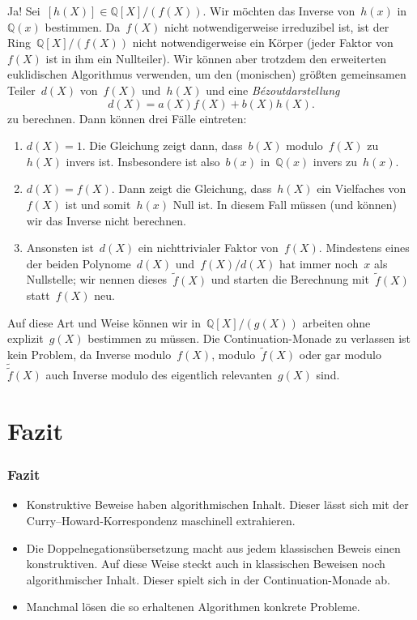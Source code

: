 \documentclass[12pt,utf8,notheorems,compress,t]{beamer}
\newcommand{\QQ}{\mathbb{Q}}
\renewcommand{\_}{\mathpunct{.}}
\newcommand{\?}{\,{:}\,}
\begin{document}
{\begin{multicols}{2}
    Ja! Sei~$[h(X)] \in \QQ[X]/(f(X))$. Wir möchten das Inverse von~$h(x)$
    in~$\QQ(x)$ bestimmen. Da~$f(X)$ nicht notwendigerweise irreduzibel ist, ist
    der Ring~$\QQ[X]/(f(X))$ nicht notwendigerweise ein Körper (jeder Faktor
    von~$f(X)$ ist in ihm ein Nullteiler). Wir können aber trotzdem den
    erweiterten euklidischen Algorithmus verwenden, um den (monischen) größten
    gemeinsamen Teiler~$d(X)$ von~$f(X)$ und~$h(X)$ und eine
    \emph{Bézoutdarstellung}
    \[ d(X) = a(X) f(X) + b(X) h(X). \]
    zu berechnen. Dann können drei Fälle eintreten:
    \begin{enumerate}\justifying
    \item $d(X) = 1$. Die Gleichung zeigt dann, dass~$b(X)$ modulo~$f(X)$
    zu~$h(X)$ invers ist. Insbesondere ist also~$b(x)$ in~$\QQ(x)$ invers
    zu~$h(x)$.
    \item $d(X) = f(X)$. Dann zeigt die Gleichung, dass~$h(X)$ ein Vielfaches
    von~$f(X)$ ist und somit~$h(x)$ Null ist. In diesem Fall müssen (und können)
    wir das Inverse nicht berechnen.
    \item Ansonsten ist~$d(X)$ ein nichttrivialer Faktor von~$f(X)$. Mindestens
    eines der beiden Polynome~$d(X)$ und~$f(X)/d(X)$ hat immer noch~$x$ als
    Nullstelle; wir nennen dieses~$\tilde f(X)$ und starten die Berechnung
    mit~$\tilde f(X)$ statt~$f(X)$ neu.
    \end{enumerate}

    Auf diese Art und Weise können wir in~$\QQ[X]/(g(X))$ arbeiten ohne
    explizit~$g(X)$ bestimmen zu müssen. Die Continuation-Monade zu verlassen ist
    kein Problem, da Inverse modulo~$f(X)$, modulo~$\tilde f(X)$ oder
    gar modulo~$\tilde{\tilde f}(X)$ auch Inverse modulo des eigentlich
    relevanten~$g(X)$ sind.
  \end{multicols}
}


\section{Fazit}

\begin{frame}\frametitle{Fazit}
  \begin{itemize}
    \item Konstruktive Beweise haben algorithmischen Inhalt. Dieser lässt sich
    mit der Curry--Howard-Korrespondenz maschinell extrahieren.
    \item Die Doppelnegationsübersetzung macht aus jedem klassischen Beweis
    einen konstruktiven. Auf diese Weise steckt auch in klassischen Beweisen
    noch algorithmischer Inhalt. Dieser spielt sich in der Continuation-Monade ab.
    \item Manchmal lösen die so erhaltenen Algorithmen konkrete Probleme.
  \end{itemize}
\end{frame}
\end{document}
